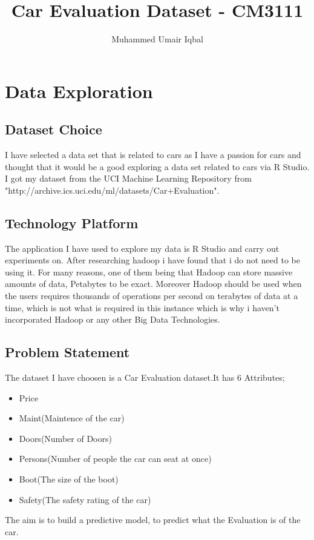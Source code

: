 \documentclass{article}\usepackage[]{graphicx}\usepackage[]{color}
\begin{document}
\title{Car Evaluation Dataset - CM3111}
\author{Muhammed Umair Iqbal}
\maketitle
\section{Data Exploration}
\subsection{Dataset Choice}
I have selected a data set that is related to cars as I have a passion for cars and thought that it would be a good exploring a data set related to cars via R Studio. I got my dataset from the UCI Machine Learning Repository from "http://archive.ics.uci.edu/ml/datasets/Car+Evaluation".
\subsection{Technology Platform}
The application I have used to explore my data is R Studio and carry out experiments on. After researching hadoop i have found that i do not need to be using it. For many reasons, one of them being that Hadoop can store massive amounts of data, Petabytes to be exact. Moreover Hadoop should be used when the users requires thousands of operations per second on terabytes of data at a time, which is not what is required in this instance which is why i haven't incorporated Hadoop or any other Big Data Technologies.

\subsection{Problem Statement}

The dataset I have choosen is a Car Evaluation dataset.It has 6 Attributes;
\begin{itemize}
\item Price
\item Maint(Maintence of the car)
\item Doors(Number of Doors)
\item Persons(Number of people the car can seat at once)
\item Boot(The size of the boot)
\item Safety(The safety rating of the car)
\end{itemize}
The aim is to build a predictive model, to predict what the Evaluation is of the car.
\end{document}
